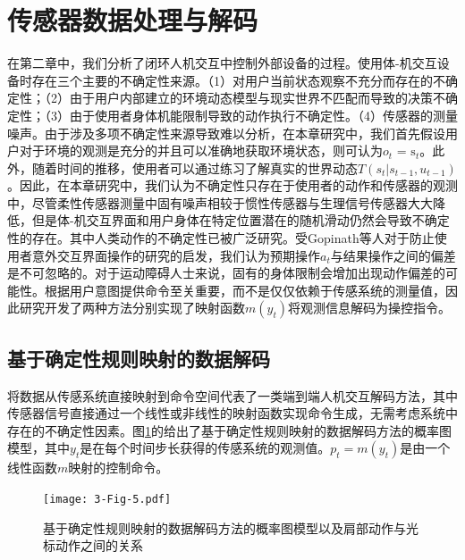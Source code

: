 \section{传感器数据处理与解码} 
在第二章中，我们分析了闭环人机交互中控制外部设备的过程。使用体-机交互设备时存在三个主要的不确定性来源。（1）对用户当前状态观察不充分而存在的不确定性；（2）由于用户内部建立的环境动态模型与现实世界不匹配而导致的决策不确定性；（3）由于使用者身体机能限制导致的动作执行不确定性。（4）传感器的测量噪声。由于涉及多项不确定性来源导致难以分析，在本章研究中，我们首先假设用户对于环境的观测是充分的并且可以准确地获取环境状态，则可认为${o_t}{\text{ = }}{{\text{s}}_t}$。此外，随着时间的推移，使用者可以通过练习了解真实的世界动态$T({s_t}|{s_{t - 1}},{u_{t - 1}})$。因此，在本章研究中，我们认为不确定性只存在于使用者的动作和传感器的观测中，尽管柔性传感器测量中固有噪声相较于惯性传感器与生理信号传感器大大降低，但是体-机交互界面和用户身体在特定位置潜在的随机滑动仍然会导致不确定性的存在。其中人类动作的不确定性已被广泛研究\cite{churchlandCentralSourceMovement2006,vanbeersRoleExecutionNoise2004, desantisGuidingFunctionalReorganization2020a}。受Gopinath等人对于防止使用者意外交互界面操作的研究\cite{gopinathCustomizedHandlingUnintended2021}的启发，我们认为预期操作$a_t$与结果操作之间的偏差是不可忽略的。对于运动障碍人士来说，固有的身体限制会增加出现动作偏差的可能性。根据用户意图提供命令至关重要，而不是仅仅依赖于传感系统的测量值，因此研究开发了两种方法分别实现了映射函数$m(y_t)$将观测信息解码为操控指令。  

\subsection{基于确定性规则映射的数据解码}
将数据从传感系统直接映射到命令空间代表了一类端到端人机交互解码方法，其中传感器信号直接通过一个线性或非线性的映射函数实现命令生成，无需考虑系统中存在的不确定性因素。图\ref{fig:3-5}的给出了基于确定性规则映射的数据解码方法的概率图模型，其中${y_t}$是在每个时间步长获得的传感系统的观测值。${{p}_t} = m({{y}_t})$是由一个线性函数$m$映射的控制命令。

\begin{figure}[htb]
    \centering
    \texttt{[image: 3-Fig-5.pdf]}
    \caption{基于确定性规则映射的数据解码方法的概率图模型以及肩部动作与光标动作之间的关系}
    \label{fig:3-5}
\end{figure} 

